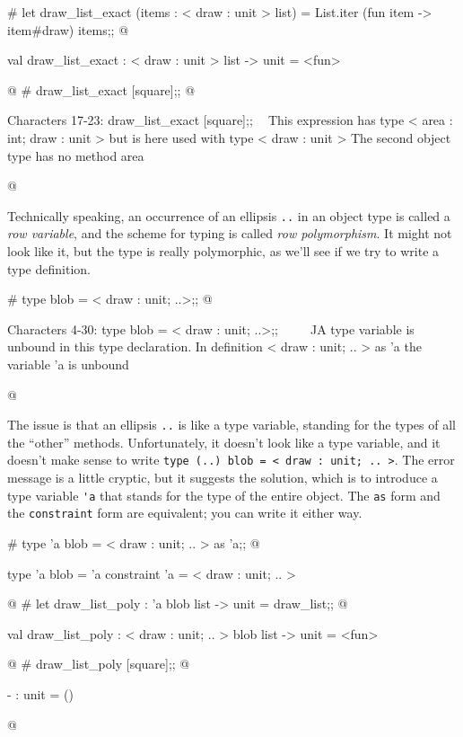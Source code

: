 \begin{ocaml}
# let draw_list_exact (items : < draw : unit > list) =
     List.iter (fun item -> item#draw) items;;
@
\begin{topoutput}
val draw_list_exact : < draw : unit > list -> unit = <fun>
\end{topoutput}
@
# draw_list_exact [square];;
@
\begin{toperror}
Characters 17-23:
  draw_list_exact [square];;
                   ^^^^^^
This expression has type < area : int; draw : unit >
but is here used with type < draw : unit >
The second object type has no method area
\end{toperror}
@
\end{ocaml}
%
Technically speaking, an occurrence of an ellipsis \hbox{\lstinline/../} in an object type is called a \emph{row
variable}, and the scheme for typing is called \emph{row polymorphism}.  It might not look like it,
but the type is really polymorphic, as we'll see if we try to write a type definition.

\begin{ocaml}
# type blob = < draw : unit; ..>;;
@
\begin{toperror}
Characters 4-30:
  type blob = < draw : unit; ..>;;
      ^^^^^^^^^^^^^^^^^^^^^^^^^^
A type variable is unbound in this type declaration.
In definition < draw : unit; .. > as 'a the variable 'a is unbound
\end{toperror}
@
\end{ocaml}
%
\label{keyword:as(object-types)}
\label{keyword:constraint}
The issue is that an ellipsis \hbox{\lstinline/../} is like a type variable, standing for the types of all the
``other'' methods.  Unfortunately, it doesn't look like a type variable, and it doesn't make sense to
write \hbox{\lstinline/type (..) blob = < draw : unit; .. >/}.  The error message is a little cryptic, but
it suggests the solution, which is to introduce a type variable \hbox{\lstinline/'a/} that stands for the
type of the entire object.  The \hbox{\lstinline/as/} form and the \hbox{\lstinline/constraint/} form are
equivalent; you can write it either way.

\begin{ocaml}
# type 'a blob = < draw : unit; .. > as 'a;;
@
\begin{topoutput}
type 'a blob = 'a constraint 'a = < draw : unit; .. >
\end{topoutput}
@
# let draw_list_poly : 'a blob list -> unit = draw_list;;
@
\begin{topoutput}
val draw_list_poly : < draw : unit; .. > blob list -> unit = <fun>
\end{topoutput}
@
# draw_list_poly [square];;
@
\begin{topoutput}
- : unit = ()
\end{topoutput}
@
\end{ocaml}


